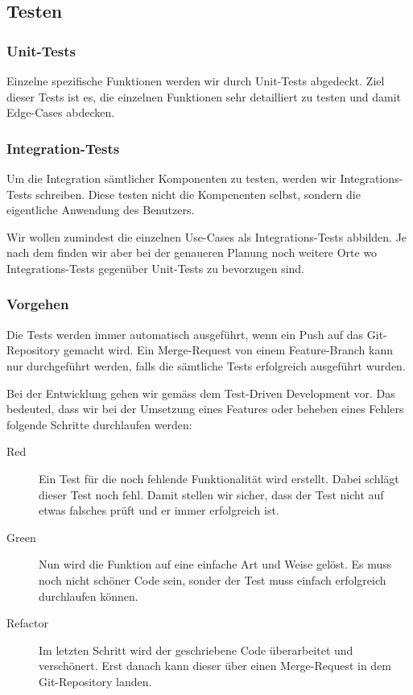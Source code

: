 \documentclass[a4paper]{article}
\begin{document}
\subsection{Testen}

\subsubsection{Unit-Tests}

Einzelne spezifische Funktionen werden wir durch Unit-Tests abgedeckt.
Ziel dieser Tests ist es, die einzelnen Funktionen sehr detailliert zu testen und damit Edge-Cases abdecken.

\subsubsection{Integration-Tests}

Um die Integration sämtlicher Komponenten zu testen, werden wir Integrations-Tests schreiben.
Diese testen nicht die Kompenenten selbst, sondern die eigentliche Anwendung des Benutzers.

Wir wollen zumindest die einzelnen Use-Cases als Integrations-Tests abbilden.
Je nach dem finden wir aber bei der genaueren Planung noch weitere Orte wo Integrations-Tests gegenüber Unit-Tests zu bevorzugen sind.

\subsubsection{Vorgehen}

Die Tests werden immer automatisch ausgeführt, wenn ein Push auf das Git-Repository gemacht wird.
Ein Merge-Request von einem Feature-Branch kann nur durchgeführt werden, falls die sämtliche Tests erfolgreich ausgeführt wurden.

Bei der Entwicklung gehen wir gemäss dem Test-Driven Development vor.
Das bedeuted, dass wir bei der Umsetzung eines Features oder beheben eines Fehlers folgende Schritte durchlaufen werden:

\begin{description}
  \item[Red]
    Ein Test für die noch fehlende Funktionalität wird erstellt.
    Dabei schlägt dieser Test noch fehl.
    Damit stellen wir sicher, dass der Test nicht auf etwas falsches prüft und er immer erfolgreich ist.
  \item[Green]
    Nun wird die Funktion auf eine einfache Art und Weise gelöst.
    Es muss noch nicht schöner Code sein, sonder der Test muss einfach erfolgreich durchlaufen können.
  \item[Refactor]
    Im letzten Schritt wird der geschriebene Code überarbeitet und verschönert.
    Erst danach kann dieser über einen Merge-Request in dem Git-Repository landen.
\end{description}
\end{document}
